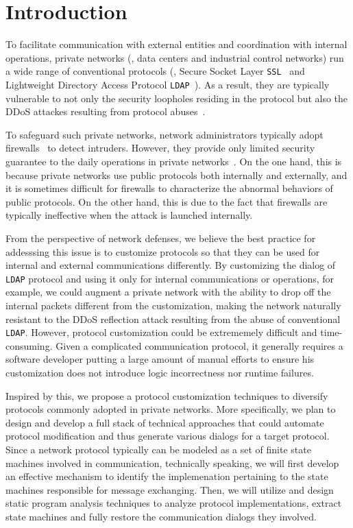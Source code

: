 \section{Introduction} 
\label{sec:intro}


To facilitate communication with external entities and coordination with
internal operations, private networks (\eg, data centers and industrial control
networks) run a wide range of conventional protocols (\eg, Secure Socket Layer
\texttt{SSL}~\citep{tls-wiki} and Lightweight Directory Access Protocol 
\texttt{LDAP}~\citep{LDAP}). 
As a result, they are typically vulnerable to not only the security loopholes
residing in the protocol but also the DDoS attackes resulting from protocol
abuses~\citep{LDAP-abuse1,LDAP-abuse2,NTP-abuse}.

To safeguard such private networks, network administrators typically adopt
firewalls~\citep{firewall} to detect intruders. 
However, they provide only limited security
guarantee to the daily operations in private networks~\citep{firewall-limitation}. 
On the one hand, this is
because private networks use public protocols both internally and externally,
and it is sometimes difficult for firewalls to characterize the abnormal
behaviors of public protocols. On the other hand, this is due to the fact that
firewalls are typically ineffective when the attack is launched internally.

From the perspective of network defenses, we believe the best practice for
addesssing this issue is to customize protocols so that they can be used for
internal and external communications differently. By customizing the dialog of
\texttt{LDAP} protocol and using it only for internal communications or
operations, for example, we could augment a private network with the ability to
drop off the internal packets different from the customization, making the
network naturally resistant to the DDoS reflection attack resulting from the
abuse of conventional \texttt{LDAP}. However, protocol customization could be
extrememely difficult and time-consuming. Given a complicated communication
protocol, it generally requires a software developer putting a large amount of
manual efforts to ensure his customization does not introduce logic
incorrectness nor runtime failures.


Inspired by this, we propose a protocol customization techniques to diversify
protocols commonly adopted in private networks. More specifically, we plan to
design and develop a full stack of technical approaches that could automate
protocol modification and thus generate various dialogs for a target protocol.
Since a network protocol typically can be modeled as a set of finite state
machines involved in communication, technically speaking, we will first develop
an effective mechanism to identify the implemenation pertaining to the state
machines responsible for message exchanging. Then, we will utilize and design
static program analysis techniques to analyze protocol implementations,  extract
state machines and fully restore the communication dialogs they involved.

